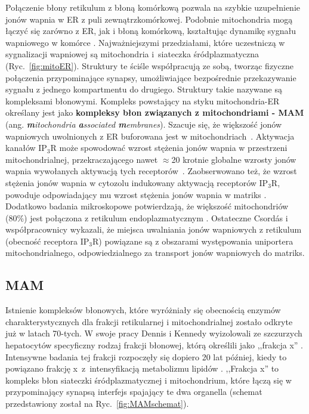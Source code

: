 Połączenie błony retikulum z błoną komórkową pozwala na szybkie uzupełnienie jonów wapnia w ER z puli zewnątrzkomórkowej. Podobnie mitochondria mogą łączyć się zarówno z ER, jak i błoną komórkową, kształtując dynamikę sygnału wapniowego w komórce \cite{Hayashi2009}. Najważniejszymi przedziałami, które uczestniczą w sygnalizacji wapniowej są mitochondria i~siateczka śródplazmatyczna (Ryc.~\ref{fig:mitoER}). Struktury te ściśle współpracują ze sobą, tworząc fizyczne połączenia przypominające synapsy, umożliwiające bezpośrednie przekazywanie sygnału z jednego kompartmentu do drugiego. Struktury takie nazywane są kompleksami błonowymi. Kompleks powstający na styku mitochondria-ER określany jest jako \textbf{kompleksy błon związanych z mitochondriami - MAM} (ang. \textit{\textbf{m}itochondria \textbf{a}ssociated \textbf{m}embranes}). Szacuje się, że większość jonów wapniowych uwolnionych z ER buforowana jest w mitochondriach~\cite{Marhl2000}. Aktywacja kanałów IP$_3$R może spowodować wzrost stężenia jonów wapnia w przestrzeni mitochondrialnej, przekraczającego nawet $\approx$20 krotnie globalne wzrosty jonów wapnia wywołanych aktywacją tych receptorów~\cite{Csordas1999}. Zaobserwowano też, że wzrost stężenia jonów wapnia w cytozolu indukowany aktywacją receptorów IP$_3$R, powoduje odpowiadający mu wzrost stężenia jonów wapnia w matriks \cite{Rizzuto2006}. Dodatkowo badania mikroskopowe potwierdzają, że większość mitochondriów (80\%) jest połączona z retikulum endoplazmatycznym \cite{Mannella1998}. Ostateczne Csord\'{a}s i współpracownicy wykazali, że miejsca uwalniania jonów wapniowych z retikulum (obecność receptora IP$_3$R) powiązane są z obszarami występowania uniportera mitochondrialnego, odpowiedzialnego za transport jonów wapniowych do matriks. \cite{Csordas1999}

\subsection{MAM}\label{ss:MAM}

Istnienie kompleksów błonowych, które wyróżniały się obecnością enzymów charakterystycznych dla frakcji retikularnej i mitochondrialnej zostało odkryte już w latach 70-tych. W swoje pracy Dennis i Kennedy wyizolowali ze szczurzych hepatocytów specyficzny rodzaj frakcji błonowej, którą określili jako ,,frakcja x'' \cite{Dennis1972}. Intensywne badania tej frakcji rozpoczęły się dopiero 20 lat później, kiedy to powiązano frakcję x~z~intensyfikacją metabolizmu lipidów \cite{Rusinol1994}. ,,Frakcja x'' to kompleks błon siateczki śródplazmatycznej i mitochondrium, które łączą się w przypominający synapsą interfejs spajający te dwa organella (schemat przedstawiony został na Ryc.~\ref{fig:MAMschemat}).

